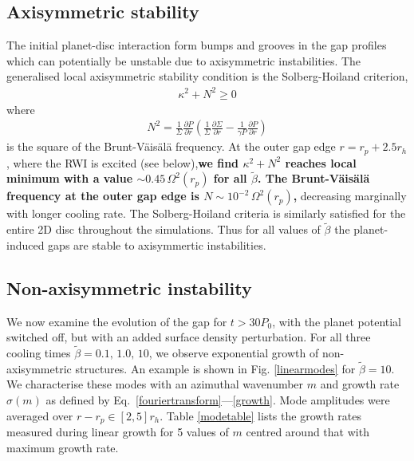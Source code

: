 \subsection{Axisymmetric stability}
The initial planet-disc interaction form bumps and grooves in the gap profiles
which can potentially be unstable due to axisymmetric instabilities. The
generalised local axisymmetric stability condition is the Solberg-Hoiland
criterion,  
\begin{align}
  \kappa^2+N^2 \geq 0 
\end{align}
where
\begin{align}
 N^2=\frac{1}{\Sigma} \frac{\partial P}{\partial r}
 \left(\frac{1}{\Sigma} \frac{\partial \Sigma}{\partial
     r}-\frac{1}{\gamma P} \frac{\partial P}{\partial r}  \right) 
\end{align}
is the square of the Brunt-V\"ais\"al\"a frequency. 
At the outer gap edge $r=r_p+2.5r_h$,  where the RWI is excited
(see below),{\bf  we find $\kappa^2 + N^2$ reaches local minimum with a value
$\sim 0.45 \, \Omega^2(r_p)$
 for all $\tilde\beta$. The
Brunt-V\"ais\"al\"a frequency at the outer gap edge is
$N\sim 10^{-2} \, \Omega^2(r_p)$,}
decreasing marginally with longer cooling rate. 
The Solberg-Hoiland criteria is similarly satisfied for the entire 2D disc throughout the 
simulations.
Thus for all values of $\tilde\beta$ the planet-induced gaps are
stable to axisymmertic instabilities. 



\subsection{Non-axisymmetric instability}\label{linear}
We now examine the evolution of the gap for $t>30P_0$, with the
planet potential switched off, but with an added surface density
perturbation. For all three cooling times $\tilde{\beta}=0.1,\, 1.0,\,
10$, we observe exponential growth of non-axisymmetric
structures. An example is shown in Fig. \ref{linearmodes} for 
$\tilde{\beta}=10$. We characterise these
modes with an azimuthal wavenumber $m$ and growth rate $\sigma(m)$ as defined by
Eq.~\ref{fouriertransform}---\ref{growth}. Mode amplitudes were
averaged over $r-r_p\in[2,5]r_h$. Table \ref{modetable}
lists the growth rates measured during 
linear growth for 5 values of $m$ centred around that with maximum
growth rate. 

